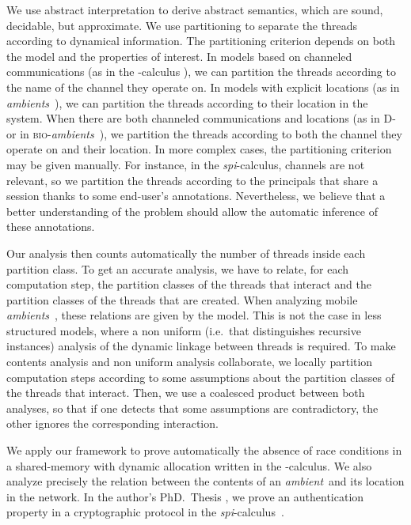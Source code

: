\documentclass{article}
\newcommand{\picalcul}{-calculus}
\newcommand{\ambient}{\emph{ambient}}
\newcommand{\ambients}{\emph{ambients}}
\newcommand{\spicalcul}{{\emph{spi}-calculus}}
\newcommand{\bioambients}{{\textsc{bio}-\emph{ambients}}}
\begin{document}
We use abstract interpretation \cite{c:thesis,cc:popl77} to derive abstract semantics, which are sound, decidable, but approximate. We use partitioning \cite{cc:popl79,bourdoncle} to separate the  threads according to dynamical information.  The partitioning criterion depends on both the model and the properties of interest. In models based on channeled communications (as in the -calculus \cite{milner:polyadic}), we can partition the threads according to the name of the channel they operate on. In models with explicit locations (as in \ambients\ \cite{ambients}), we can partition the threads according to their location in the system. When there are both channeled communications and locations (as in D- \cite{Dpi} or in \bioambients\ \cite{bio}), we partition the threads according to both the channel they operate on and their location.
In more complex cases, the partitioning criterion may be given manually.
For instance, in the \spicalcul, channels are not relevant, so we partition the threads according to the principals that share a session \cite[p:269]{feret:thesis} thanks to some end-user's annotations. Nevertheless, we believe that a better understanding of the problem 
should allow the automatic inference of these annotations.

Our analysis then counts automatically the number of threads inside  each partition class. To get an accurate analysis, we have to relate, for each computation step,  the partition classes of  the threads that interact and  the partition classes of the threads that are created. When analyzing mobile \ambients\ \cite{NiNi00popl}, these relations are given by the model.
This is not the case in less structured models, where a non uniform (i.e.~that distinguishes recursive instances) analysis \cite{feret:sas2000,feret:esop2002,feret:jlap,feret:thesis} of the dynamic linkage between threads is required. To make contents analysis and non uniform analysis collaborate, we locally partition computation steps \cite{mauborgne:rival05} 
according to some assumptions about the partition classes of the threads that interact. Then, we use a coalesced product between both analyses, so that if 
one detects that some assumptions are contradictory, the other ignores the corresponding interaction. 


We apply our framework to prove  automatically the absence of race conditions in a shared-memory with dynamic allocation written in the \picalcul. We also analyze precisely the relation between the contents of an \ambient\ and its location in the network. In the author's PhD.~Thesis \cite{feret:thesis}, we prove an authentication property \cite{BlanchetSAS02} in a cryptographic protocol \cite{Woo}   in the \spicalcul\ \cite{spi}.
\end{document}
